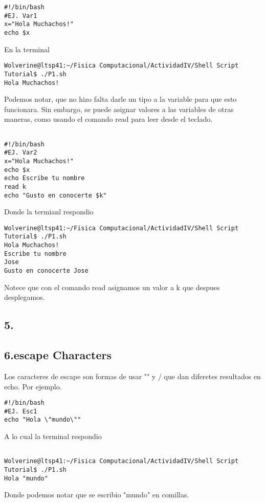 \documentclass[a4paper]{article}
\begin{document}
\begin{verbatim}
#!/bin/bash
#EJ. Var1
x="Hola Muchachos!"
echo $x
\end{verbatim}
En la terminal 

\begin{verbatim}
Wolverine@ltsp41:~/Fisica Computacional/ActividadIV/Shell Script Tutorial$ ./P1.sh
Hola Muchachos!

\end{verbatim}

Podemos notar, que no hizo falta darle un tipo a la variable para que esto funcionara. Sin embargo, se puede asignar valores a las variables de otras maneras, como usando el comando read para leer desde el teclado. 

\begin{verbatim}

#!/bin/bash
#EJ. Var2
x="Hola Muchachos!"
echo $x
echo Escribe tu nombre
read k
echo "Gusto en conocerte $k"

\end{verbatim}

Donde la termianl respondio

\begin{verbatim}
Wolverine@ltsp41:~/Fisica Computacional/ActividadIV/Shell Script Tutorial$ ./P1.sh
Hola Muchachos!
Escribe tu nombre
Jose
Gusto en conocerte Jose

\end{verbatim}

Notece que con el comando read asignamos un valor a k que despues desplegamos. 

\subsection{5.}

\subsection{6.escape Characters}

Los caracteres de escape son formas de usar "" y / que dan diferetes resultados en echo. Por ejemplo.




\begin{verbatim}
#!/bin/bash
#EJ. Esc1
echo "Hola \"mundo\""
\end{verbatim}

A lo cual la terminal respondio

\begin{verbatim}

Wolverine@ltsp41:~/Fisica Computacional/ActividadIV/Shell Script Tutorial$ ./P1.sh
Hola "mundo"

\end{verbatim}
Donde podemos notar que se escribio "mundo" en comillas.  
\end{document}
